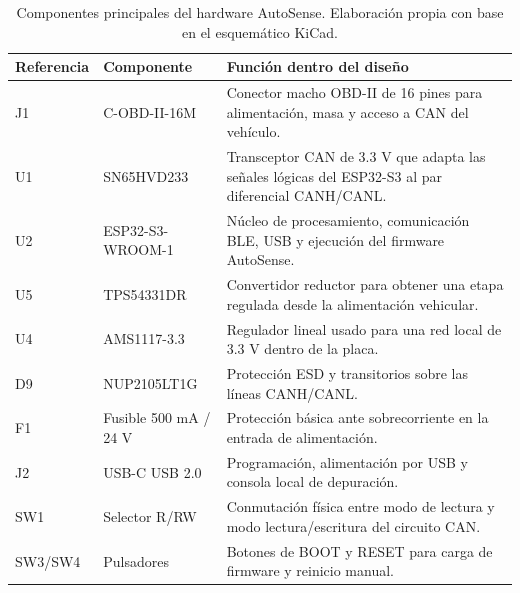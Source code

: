 \documentclass[12pt,letterpaper]{report}
\begin{document}
\begin{table}[!htbp]
\centering
\caption{Componentes principales del hardware AutoSense. Elaboración propia con base en el esquemático KiCad.}
\label{tab:hardware-componentes-principales}
\renewcommand{\arraystretch}{1.08}
\setlength{\tabcolsep}{4pt}
\small
\begin{tabular}{@{}p{}p{}p{}@{}}
\toprule
Referencia & Componente & Función dentro del diseño \\
\midrule
J1 & C-OBD-II-16M & Conector macho OBD-II de 16 pines para alimentación, masa y acceso a CAN del vehículo. \\
U1 & SN65HVD233 & Transceptor CAN de 3.3 V que adapta las señales lógicas del ESP32-S3 al par diferencial CANH/CANL. \\
U2 & ESP32-S3-WROOM-1 & Núcleo de procesamiento, comunicación BLE, USB y ejecución del firmware AutoSense. \\
U5 & TPS54331DR & Convertidor reductor para obtener una etapa regulada desde la alimentación vehicular. \\
U4 & AMS1117-3.3 & Regulador lineal usado para una red local de 3.3 V dentro de la placa. \\
D9 & NUP2105LT1G & Protección ESD y transitorios sobre las líneas CANH/CANL. \\
F1 & Fusible 500 mA / 24 V & Protección básica ante sobrecorriente en la entrada de alimentación. \\
J2 & USB-C USB 2.0 & Programación, alimentación por USB y consola local de depuración. \\
SW1 & Selector R/RW & Conmutación física entre modo de lectura y modo lectura/escritura del circuito CAN. \\
SW3/SW4 & Pulsadores & Botones de BOOT y RESET para carga de firmware y reinicio manual. \\
\bottomrule
\end{tabular}
\end{table}
\end{document}
